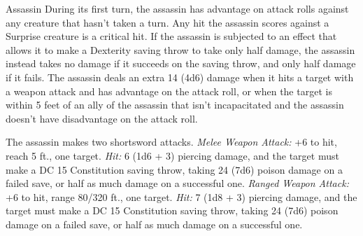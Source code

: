 \documentclass[10pt,a4paper,twoside,twocolumn,openany,bg=print,nodeprecatedcode]{dndbook}
\begin{document}
\begin{DndMonster}[float*=t]{Assassin}
\DndMonsterBasics[
armor-class = {15 (studded leather armor)},
hit-points = {\DndDice{12d8 + 24}},
speed = {30 ft.}
]
\DndMonsterAbilityScores[
 str = 11,
 dex = 16,
 con = 14,
 int = 13,
 wis = 11,
 cha = 10
]
\DndMonsterDetails[
saving-throws = {Dex +6, Int +4},
skills = {Acrobatics +6, Deception +3, Perception +3, Stealth +9},
damage-resistances = {poison},
languages = {Thieves' cant plus any two languages},
challenge = 8,
]
During its first turn, the assassin has advantage on attack rolls against any creature that hasn't taken a turn. Any hit the assassin scores against a Surprise creature is a critical hit.
If the assassin is subjected to an effect that allows it to make a Dexterity saving throw to take only half damage, the assassin instead takes no damage if it succeeds on the saving throw, and only half damage if it fails.
The assassin deals an extra 14 (4d6) damage when it hits a target with a weapon attack and has advantage on the attack roll, or when the target is within 5 feet of an ally of the assassin that isn't incapacitated and the assassin doesn't have disadvantage on the attack roll.
\par
{}
The assassin makes two shortsword attacks.
\textsl{Melee Weapon Attack:} +6 to hit, reach 5 ft., one target. \textsl{Hit:} 6 (1d6 + 3) piercing damage, and the target must make a DC 15 Constitution saving throw, taking 24 (7d6) poison damage on a failed save, or half as much damage on a successful one.
\textsl{Ranged Weapon Attack:} +6 to hit, range 80/320 ft., one target. \textsl{Hit:} 7 (1d8 + 3) piercing damage, and the target must make a DC 15 Constitution saving throw, taking 24 (7d6) poison damage on a failed save, or half as much damage on a successful one.
\end{DndMonster}


\clearpage
\end{document}
